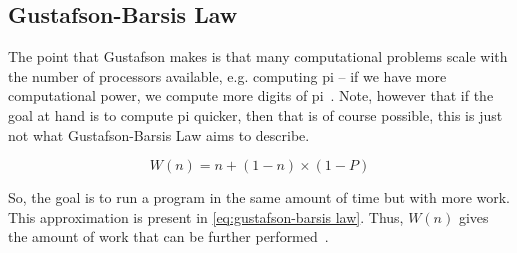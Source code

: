 \subsection{Gustafson-Barsis Law}
\label{sec:gustafson-barsis law}

The point that Gustafson makes is that many computational problems scale with the number of processors available, e.g. computing pi -- if we have more computational power, we compute more digits of pi~\cite{amdahlorgustafson2011}.
Note, however that if the goal at hand is to compute pi quicker, then that is of course possible, this is just not what Gustafson-Barsis Law aims to describe.

\begin{equation}
  \label{eq:gustafson-barsis law}
  W(n) = n + (1-n) \times (1-P)
\end{equation}

So, the goal is to run a program in the same amount of time but with more work.
This approximation is present in \cref{eq:gustafson-barsis law}.
Thus, $W(n)$ gives the amount of work that can be further performed~\cite{gustafson1988reevaluating}.

